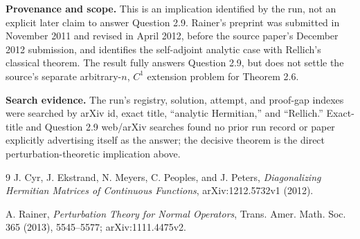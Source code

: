 \documentclass[10pt]{article}
\begin{document}
\textbf{Provenance and scope.} This is an implication identified by the run,
not an explicit later claim to answer Question 2.9.  Rainer's preprint was
submitted in November 2011 and revised in April 2012, before the source paper's
December 2012 submission, and identifies the self-adjoint analytic case with
Rellich's classical theorem.  The result fully answers Question 2.9, but does
not settle the source's separate arbitrary-$n$, $C^1$ extension problem for
Theorem 2.6.

\textbf{Search evidence.} The run's registry, solution, attempt, and proof-gap
indexes were searched by arXiv id, exact title, ``analytic Hermitian,'' and
``Rellich.''  Exact-title and Question 2.9 web/arXiv searches found no prior run
record or paper explicitly advertising itself as the answer; the decisive
theorem is the direct perturbation-theoretic implication above.

\begin{thebibliography}{9}
J. Cyr, J. Ekstrand, N. Meyers, C. Peoples, and J. Peters,
\emph{Diagonalizing Hermitian Matrices of Continuous Functions},
arXiv:1212.5732v1 (2012).

A. Rainer,
\emph{Perturbation Theory for Normal Operators},
Trans. Amer. Math. Soc. 365 (2013), 5545--5577;
arXiv:1111.4475v2.
\end{thebibliography}
\end{document}

